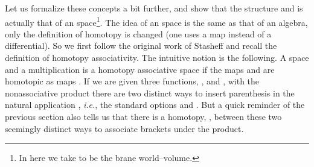 \documentclass[a4paper,11pt]{article}
\begin{document}
Let us formalize these concepts a bit further, and show that the 
structure \coordHE{} and \coordHE{} is 
actually that of an \coordHE{} space\footnote{In here we take \coordHE{} to 
be the brane world--volume.}. The idea of an \coordHE{} 
space is the same as that of an \coordHE{} algebra, only the definition 
of homotopy is changed (one uses a map instead of a differential). So 
we first follow the original work of Stasheff \cite{Stasheff} and 
recall the definition of homotopy associativity. The intuitive notion 
is the following. A space \coordHE{} and a multiplication \coordHE{} is a homotopy associative space if the maps \coordHE{} and \coordHE{} are homotopic as maps \coordHE{}. If we are given three functions, \coordHE{}, \coordHE{} 
and \coordHE{}, with the nonassociative product \myHighlight{$\bullet$}\coordHE{} there are two 
distinct ways to insert parenthesis in the natural application 
\coordHE{}, \textit{i.e.}, the standard options \coordHE{} and \coordHE{}. But a quick reminder of the previous section also tells us 
that there is a homotopy, \coordHE{}, between these two seemingly 
distinct ways to associate brackets under the \myHighlight{$\bullet$}\coordHE{} product.
\end{document}
